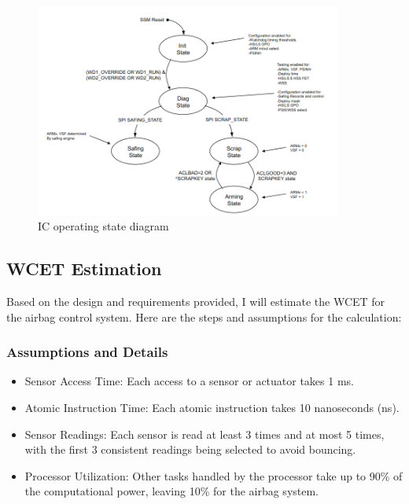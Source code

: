 \documentclass[12pt	]{article}
\begin{document}
\begin{figure}[h]
	\centering
	\includegraphics[width=0.9\textwidth]{Images/img10.png}
	\caption{IC operating state diagram}
	\label{fig:IC operating state diagram}
\end{figure}















\subsection{WCET Estimation}


Based on the design and requirements provided, I will estimate the WCET for the airbag control system. Here are the steps and assumptions for the calculation:

\subsubsection{Assumptions and Details}
\begin{itemize}
	\item Sensor Access Time: Each access to a sensor or actuator takes 1 ms.
	\item Atomic Instruction Time: Each atomic instruction takes 10 nanoseconds (ns).
	\item Sensor Readings: Each sensor is read at least 3 times and at most 5 times, with the first 3 consistent readings being selected to avoid bouncing.
	\item Processor Utilization: Other tasks handled by the processor take up to 90\% of the computational power, leaving 10\% for the airbag system.
\end{itemize}
\end{document}

